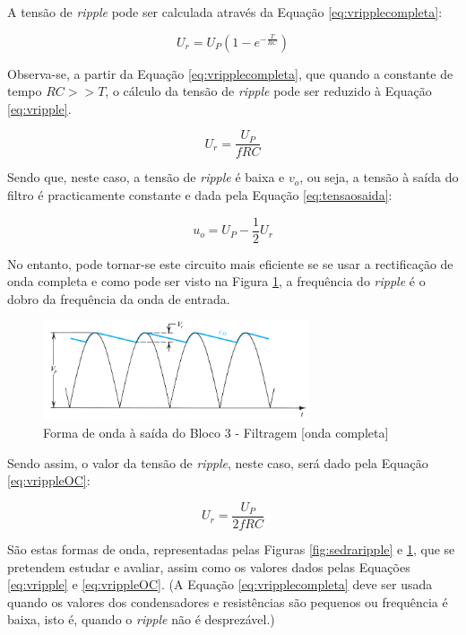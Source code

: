 A tensão de \textit{ripple} pode ser calculada através da Equação \ref{eq:vripplecompleta}:

\begin{equation} \label{eq:vripplecompleta}
	U_{r} = U_{P}(1-e^{-\frac{T}{RC}})
\end{equation}

Observa-se, a partir da Equação \ref{eq:vripplecompleta}, que quando a constante de tempo $RC >> T$, o cálculo da tensão de \textit{ripple} pode ser reduzido à Equação \ref{eq:vripple}.

\begin{equation} \label{eq:vripple}
	U_{r} = \frac{U_{P}}{fRC}
\end{equation}

Sendo que, neste caso, a tensão de \textit{ripple} é baixa e $v_{o}$, ou seja, a tensão à saída do filtro é practicamente constante e dada pela Equação \ref{eq:tensaosaida}:

\begin{equation} \label{eq:tensaosaida}
	u_{o} = U_{P} - \dfrac{1}{2}U_{r}	
\end{equation}

No entanto, pode tornar-se este circuito mais eficiente se se usar a rectificação de onda completa e como pode ser visto na Figura \ref{fig:sedraripplecompleta}, a frequência do \textit{ripple} é o dobro da frequência da onda de entrada.

\begin{figure}[hbtp]
	\centering
	\includegraphics[width=0.7\textwidth]{figures/sedra_ripple_OC.png}
	\caption{Forma de onda à saída do Bloco 3 - Filtragem [onda completa] \cite{sedrasmith}}
	\label{fig:sedraripplecompleta}
\end{figure}

Sendo assim, o valor da tensão de \textit{ripple}, neste caso, será dado pela Equação \ref{eq:vrippleOC}:

\begin{equation} \label{eq:vrippleOC}
	U_{r} = \frac{U_{P}}{2fRC}
\end{equation}

São estas formas de onda, representadas pelas Figuras \ref{fig:sedraripple} e \ref{fig:sedraripplecompleta}, que se pretendem estudar e avaliar, assim como os valores dados pelas Equações \ref{eq:vripple} e \ref{eq:vrippleOC}. (A Equação \ref{eq:vripplecompleta} deve ser usada quando os valores dos condensadores e resistências são pequenos ou frequência é baixa, isto é, quando o \textit{ripple} não é desprezável.)

